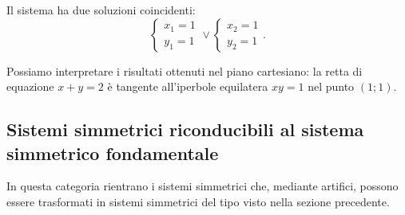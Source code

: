 \begin{exrig}
\begin{esempio}
\begin{multicols}{2}
Il sistema ha due soluzioni coincidenti: \[ \left\{\begin{array}{l}{x_1=1}\\{y_1=1}\end{array}\right.\vee \left\{\begin{array}{l}{x_2=1}\\{y_2=1}\end{array}\right.. \]

Possiamo interpretare i risultati ottenuti nel piano cartesiano: la retta di equazione $x+y=2$ è tangente all'iperbole equilatera $xy=1$ nel punto $(1;1)$.
\begin{center}

\end{center}
\end{multicols}
\end{esempio}
\end{exrig}
\ovalbox{\risolvii \ref{ese:6.22}, \ref{ese:6.23}, \ref{ese:6.24}, \ref{ese:6.25}, \ref{ese:6.26}, \ref{ese:6.27}}

\subsection{Sistemi simmetrici riconducibili al sistema simmetrico fondamentale}

In questa categoria rientrano i sistemi simmetrici che, mediante artifici, possono essere trasformati in sistemi simmetrici del tipo visto nella sezione precedente.

